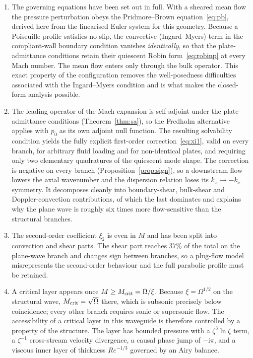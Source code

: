 \documentclass[11pt,a4paper]{article}
\newcommand{\Om}{\Omega}
\newcommand{\ii}{\mathrm{i}}
\newcommand{\Rey}{\mathit{Re}}
\theoremstyle{plain}
\theoremstyle{remark}
\begin{document}
\begin{enumerate}[label=\arabic*.,leftmargin=2em,itemsep=3pt]
\item The governing equations have been set out in full. With a sheared mean flow the pressure
perturbation obeys the Pridmore--Brown equation~\eqref{eq:pb}, derived here from the linearised Euler
system for this geometry. Because a Poiseuille profile satisfies no-slip, the convective
(Ingard--Myers) term in the compliant-wall boundary condition vanishes \emph{identically}, so that the
plate-admittance conditions retain their quiescent Robin form~\eqref{eq:robinp} at every Mach number.
The mean flow enters only through the bulk operator. This exact property of the configuration removes
the well-posedness difficulties associated with the Ingard--Myers condition and is what makes the
closed-form analysis possible.

\item The leading operator of the Mach expansion is self-adjoint under the plate-admittance conditions
(Theorem~\ref{thm:sa}), so the Fredholm alternative applies with $p_0$ as its own adjoint null
function. The resulting solvability condition yields the fully explicit first-order
correction~\eqref{eq:xi1}, valid on every branch, for arbitrary fluid loading and for non-identical
plates, and requiring only two elementary quadratures of the quiescent mode shape. The correction is
negative on every branch (Proposition~\ref{prop:sign}), so a downstream flow lowers the axial
wavenumber and the dispersion relation loses its $k_x\to-k_x$ symmetry. It decomposes cleanly into
boundary-shear, bulk-shear and Doppler-convection contributions, of which the last dominates and
explains why the plane wave is roughly six times more flow-sensitive than the structural branches.

\item The second-order coefficient $\xi_2$ is even in $M$ and has been split into convection and shear
parts. The shear part reaches $37\%$ of the total on the plane-wave branch and changes sign between
branches, so a plug-flow model misrepresents the second-order behaviour and the full parabolic profile
must be retained.

\item A critical layer appears once $M\ge M_{\rm crit}=\Om/\xi$. Because $\xi=\Om^{1/2}$ on the
structural wave, $M_{\rm crit}=\sqrt\Om$ there, which is subsonic precisely below coincidence; every
other branch requires sonic or supersonic flow. The accessibility of a critical layer in this waveguide
is therefore controlled by a property of the structure. The layer has bounded pressure with a
$\zeta^3\ln\zeta$ term, a $\zeta^{-1}$ cross-stream velocity divergence, a causal phase jump of
$-\ii\pi$, and a viscous inner layer of thickness $\Rey^{-1/3}$ governed by an Airy balance.


\end{enumerate}
\end{document}
